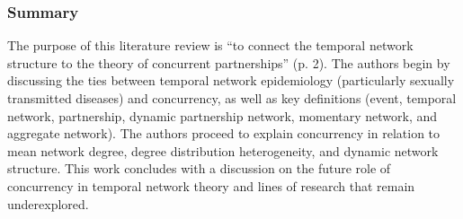 \subsubsection*{Summary}
The purpose of this literature review is ``to connect the temporal network structure to the theory of concurrent partnerships'' (p. 2). The authors begin by discussing the ties between temporal network epidemiology (particularly sexually transmitted diseases) and concurrency, as well as key definitions (event, temporal network, partnership, dynamic partnership network, momentary network, and aggregate network). The authors proceed to explain concurrency in relation to mean network degree, degree distribution heterogeneity, and dynamic network structure. This work concludes with a discussion on the future role of concurrency in temporal network theory and lines of research that remain underexplored.
